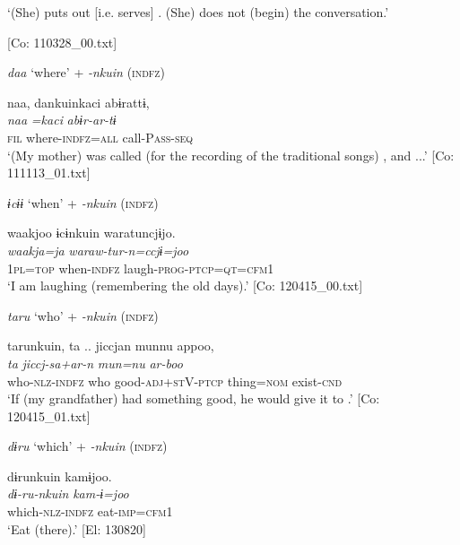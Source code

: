       ‘(She) puts out [i.e. serves] . (She) does not (begin) the conversation.’

      [Co: 110328\_00.txt]

\ex \label{ex:7:22b}\textit{daa} ‘where’ + \textit{{}-nkuin} (\textsc{indfz})

\glll  naa,  dankuinkaci  abɨrattɨ,\\
\textit{naa}  \textit{=kaci}  \textit{abɨr-ar-tɨ}\\
\textsc{fil}  where-\textsc{indfz}=\textsc{all}  call-P\textsc{ass}-\textsc{seq}\\
\glt ‘(My mother) was called (for the recording of the traditional songs) , and ...’ [Co: 111113\_01.txt]

\ex \label{ex:7:22c}\textit{ɨcɨɨ} ‘when’ + \textit{{}-nkuin} (\textsc{indfz})

\glll  waakjoo  ɨcɨnkuin  waratuncjɨjo.\\
\textit{waakja=ja}  \textit{}  \textit{waraw-tur-n=ccjɨ=joo}\\
1\textsc{pl}=\textsc{top}  when-\textsc{indfz}  laugh-\textsc{prog}-\textsc{ptcp}=\textsc{qt}=\textsc{cfm}1\\
\glt ‘I am  laughing (remembering the old days).’ [Co: 120415\_00.txt]

\ex \label{ex:7:22d}\textit{taru} ‘who’ + \textit{{}-nkuin} (\textsc{indfz})

\glll  tarunkuin,  ta ..  jiccjan  munnu  appoo,\\
\textit{}  \textit{ta}  \textit{jiccj-sa+ar-n}  \textit{mun=nu}  \textit{ar-boo}\\
who-\textsc{nlz}-\textsc{indfz}  who  good-\textsc{adj}+\textsc{st}V-\textsc{ptcp}  thing=\textsc{nom}  exist-\textsc{cnd}\\
\glt ‘If (my grandfather) had something good, he would give it to .’ [Co: 120415\_01.txt]

\ex \label{ex:7:22e} \textit{dɨru} ‘which’ + \textit{{}-nkuin} (\textsc{indfz})

\glll  dɨrunkuin  kamɨjoo.\\
\textit{dɨ-ru-nkuin}  \textit{kam-ɨ=joo}\\
which-\textsc{nlz}-\textsc{indfz}  eat-\textsc{imp}=\textsc{cfm}1\\
\glt ‘Eat  (there).’ [El: 130820]
\z
\z


